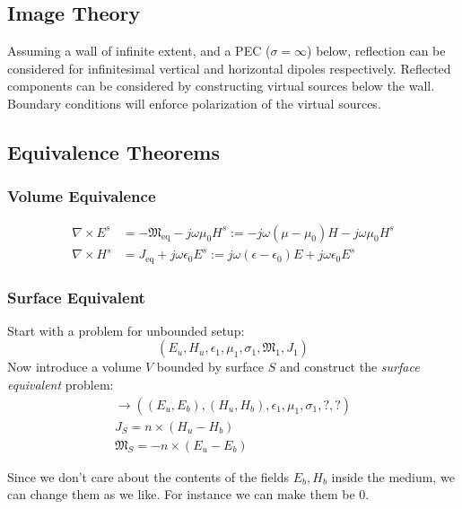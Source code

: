 \documentclass{article}
\numberwithin{equation}{section}
\begin{document}
\subsection{Image Theory}
Assuming a wall of infinite extent, and a PEC ($\sigma=\infty$) below, reflection can be considered for infinitesimal vertical and horizontal dipoles respectively. Reflected components can be considered by constructing virtual sources below the wall. Boundary conditions will enforce polarization of the virtual sources.
\subsection{Equivalence Theorems}
\subsubsection*{Volume Equivalence}
\begin{subequations}
    \begin{align} \label{eq:VolumeEquivalence}
        \nabla \times E^s &= -\mathfrak{M}_{\text{eq}} - j \omega \mu_0 H^s := -j \omega( \mu - \mu_0 )H -j \omega \mu_0 H^s \\
        \nabla \times H^s &= J_{\text{eq}} + j \omega \epsilon_0 E^s := j \omega( \epsilon - \epsilon_0 )E + j \omega \epsilon_0 E^s
    \end{align}
\end{subequations}
\subsubsection*{Surface Equivalent}
Start with a problem for unbounded setup:
\begin{equation} \label{eq:unboundedSetup}
    \left( E_u, H_u, \epsilon_1, \mu_1, \sigma_1, \mathfrak{M}_1, J_1 \right)
\end{equation}
Now introduce a volume $V$ bounded by surface $S$ and construct the \emph{surface equivalent} problem:
\begin{subequations} \label{eq:surfaceEquivalent}
\begin{align}
    \to \left( (E_u,E_b), (H_u, H_b), \epsilon_1, \mu_1, \sigma_1, ?, ? \right) \\
    J_S = n \times ( H_u - H_b ) \\
    \mathfrak{M}_S = -n \times ( E_u - E_b )
\end{align}
\end{subequations}

Since we don't care about the contents of the fields $E_b, H_b$ inside the medium, we can change them as we like. For instance we can make them be 0.
\end{document}
